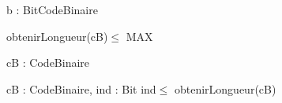 \begin{algorithme}

    {b : Bit}{CodeBinaire}{}


    {
    }
    {obtenirLongueur(cB)$\le$ MAX}





    {cB : CodeBinaire}{\naturelNonNul}{}


    {cB : CodeBinaire, ind : \naturelNonNul}{Bit}
    {ind$\le$ obtenirLongueur(cB)}

\end{algorithme}
